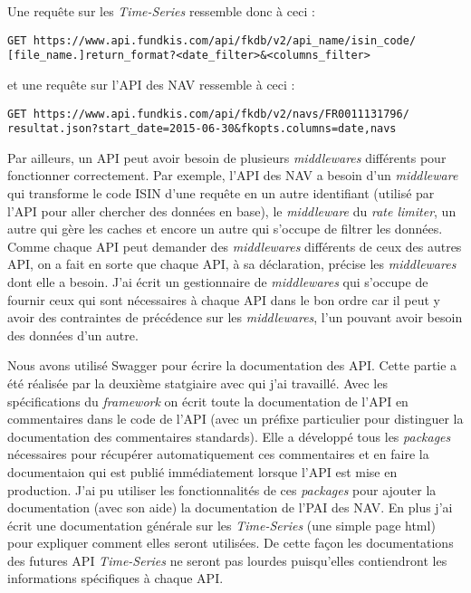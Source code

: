 \vspace{3mm}

Une requête sur les \textit{Time-Series} ressemble donc à ceci :

\vspace{3mm}

\noindent
{\color{blue}
\texttt{GET https://www.api.fundkis.com/api/fkdb/v2/{api\_name}/{isin\_code}/} \\
\texttt{[{file\_name}.]{return\_format}?<date\_filter>\&<columns\_filter>}
}

\vspace{3mm}

et une requête sur l'API des NAV ressemble à ceci :

\vspace{3mm}

\noindent
{\color{blue}
\texttt{GET https://www.api.fundkis.com/api/fkdb/v2/navs/FR0011131796/} \\
\texttt{resultat.json?start\_date=2015-06-30\&fkopts.columns=date,navs}
}


\vspace{3mm}
Par ailleurs, un API peut avoir besoin de plusieurs \textit{middlewares} différents pour fonctionner correctement. Par exemple, l'API des NAV a besoin d'un \textit{middleware} qui transforme le code ISIN d'une requête en un autre identifiant (utilisé par l'API pour aller chercher des données en base), le \textit{middleware} du \textit{rate limiter}, un autre qui gère les caches et encore un autre qui s'occupe de filtrer les données. Comme chaque API peut demander des \textit{middlewares} différents de ceux des autres API, on a fait en sorte que chaque API, à sa déclaration, précise les \textit{middlewares} dont elle a besoin. J'ai écrit un gestionnaire de \textit{middlewares} qui s'occupe de fournir ceux qui sont nécessaires à chaque API dans le bon ordre car il peut y avoir des contraintes de précédence sur les \textit{middlewares}, l'un pouvant avoir besoin des données d'un autre.

\vspace{3mm}

Nous avons utilisé Swagger pour écrire la documentation des API. Cette partie a été réalisée par la deuxième statgiaire avec qui j'ai travaillé. Avec les spécifications du \textit{framework} on écrit toute la documentation de l'API en commentaires dans le code de l'API (avec un préfixe particulier pour distinguer la documentation des commentaires standards). Elle a développé tous les \textit{packages} nécessaires pour récupérer automatiquement ces commentaires et en faire la documentaion qui est publié immédiatement lorsque l'API est mise en production. J'ai pu utiliser les fonctionnalités de ces \textit{packages} pour ajouter la documentation (avec son aide) la documentation de l'PAI des NAV. En plus j'ai écrit une documentation générale sur les \textit{Time-Series} (une simple page html) pour expliquer comment elles seront utilisées. De cette façon les documentations des futures API \textit{Time-Series} ne seront pas lourdes puisqu'elles contiendront les informations spécifiques à chaque API.
